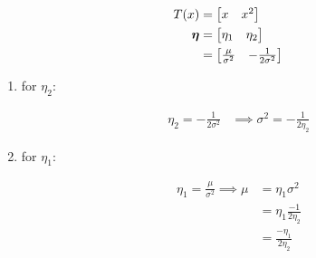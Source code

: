 \documentclass{article}
\begin{document}
\begin{equation}\begin{split}
T(x) &= \begin{bmatrix} x & x^2   \end{bmatrix}\\
\boldsymbol{\eta} &= \begin{bmatrix} \eta_1 & \eta_2   \end{bmatrix}\\
&= \begin{bmatrix} \frac{ \mu}{ \sigma^2}  & - \frac{1}{ 2 \sigma^2}   \end{bmatrix}\\
\end{split}\end{equation}

\begin{enumerate}
\item for $\eta_2$:

\begin{equation}\begin{split}
\eta_2 = - \frac{1}{2 \sigma^2} &\implies \sigma^2 = - \frac{1}{2 \eta_2}
\end{split}\end{equation}

\item for $\eta_1$:

\begin{equation}\begin{split}
\eta_1 = \frac{\mu}{\sigma^2} \implies \mu &= \eta_1 \sigma^2\\ 
&= \eta_1 \frac{-1}{2 \eta_2}\\ 
&=   \frac{ - \eta_1 }{2 \eta_2}\\
\end{split}\end{equation}

\end{enumerate}

\end{document}
